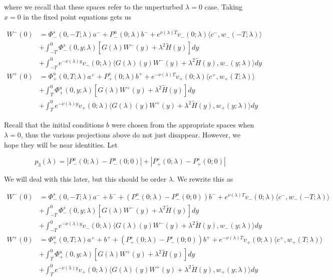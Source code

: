 \documentclass[12pt]{article}
\begin{document}
\begin{enumerate}
where we recall that these spaces refer to the unperturbed $\lambda = 0$ case. Taking $x = 0$ in the fixed point equations gets us

\begin{align*}
W^-(0) &= \Phi^s_-(0, -T; \lambda)a^- + P^u_-(0; \lambda)b^- + e^{\nu(\lambda)T} v_-(0; \lambda) \langle c^-, w_-(-T; \lambda) \rangle \\
&+ \int_{-T}^0 \Phi^s_-(0, y; \lambda) [ G(\lambda)W^-(y) + \lambda^2 \tilde{H}(y) ] dy \\
&+ \int_{-T}^0 
e^{-\nu(\lambda)y} v_-(0; \lambda) \langle G(\lambda)(y)W^-(y) + \lambda^2 \tilde{H}(y), w_-(y; \lambda) \rangle dy \\
W^+(0) &= \Phi^u_+(0, T; \lambda)a^+ + P^s_+(0; \lambda)b^+ + e^{-\nu(\lambda)T} v_+(0; \lambda) \langle c^+, w_+(T; \lambda) \rangle \\
&+ \int_T^0 \Phi^u_+(0, y; \lambda) [ G(\lambda)W^+(y) + \lambda^2 \tilde{H}(y) ] dy \\
&+ \int_T^0 e^{-\nu(\lambda)y} v_+(0; \lambda) \langle G(\lambda)(y)W^+(y) + \lambda^2 \tilde{H}(y), w_+(y; \lambda) \rangle dy
\end{align*}

Recall that the initial conditions $b$ were chosen from the appropriate spaces when $\lambda = 0$, thus the various projections above do not just disappear. However, we hope they will be near identities. Let

\[
p_3(\lambda) = |P^u_-(0;\lambda) - P^u_-(0; 0)| + |P^s_+(0;\lambda) - P^s_+(0;0)|
\]

We will deal with this later, but this should be order $\lambda$. We rewrite this as

\begin{align*}
W^-(0) &= \Phi^s_-(0, -T; \lambda )a^- + b^- + (P^u_-(0; \lambda) - P^u_-(0; 0))b^- + e^{\nu(\lambda)T} v_-(0; \lambda) \langle c^-, w_-(-T; \lambda) \rangle \\
&+ \int_{-T}^0 \Phi^s_-(0, y; \lambda) [ G(\lambda)W^-(y) + \lambda^2 \tilde{H}(y) ] dy \\
&+ \int_{-T}^0 
e^{-\nu(\lambda)y} v_-(0; \lambda) \langle G(\lambda)(y)W^-(y) + \lambda^2 \tilde{H}(y), w_-(y; \lambda) \rangle dy \\
W^+(0) &= \Phi^u_+(0, T; \lambda)a^+ + b^+ + (P^s_+(0; \lambda) - P^s_-(0; 0))b^+ + e^{-\nu(\lambda)T} v_+(0; \lambda) \langle c^+, w_+(T; \lambda) \rangle \\
&+ \int_T^0 \Phi^u_+(0, y; \lambda) [ G(\lambda)W^+(y) + \lambda^2 \tilde{H}(y) ] dy \\
&+ \int_T^0 e^{-\nu(\lambda)y} v_+(0; \lambda) \langle G(\lambda)(y)W^+(y) + \lambda^2 \tilde{H}(y), w_+(y; \lambda) \rangle dy
\end{align*}


\end{enumerate}
\end{document}
